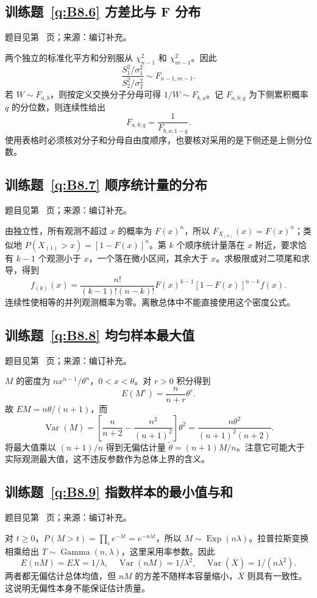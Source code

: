 \documentclass[UTF8,12pt,a4paper,fontset=fandol]{ctexbook}
\begin{document}
\subsection*{训练题~\ref{q:B8.6} 方差比与 F 分布}\label{a:B8.6}{\small 题目见第~\pageref{q:B8.6} 页；来源：编订补充。}
\begin{solve}两个独立的标准化平方和分别服从 $\chi^2_{n-1}$ 和 $\chi^2_{m-1}$。因此\[\frac{S_1^2/\sigma_1^2}{S_2^2/\sigma_2^2}\sim F_{n-1,m-1}.\]若 $W\sim F_{a,b}$，则按定义交换分子分母可得 $1/W\sim F_{b,a}$。记 $F_{a,b;q}$ 为下侧累积概率 $q$ 的分位数，则连续性给出\[F_{a,b;q}=\frac{1}{F_{b,a;1-q}}.\]使用表格时必须核对分子和分母自由度顺序，也要核对采用的是下侧还是上侧分位数。\end{solve}

\subsection*{训练题~\ref{q:B8.7} 顺序统计量的分布}\label{a:B8.7}{\small 题目见第~\pageref{q:B8.7} 页；来源：编订补充。}
\begin{solve}由独立性，所有观测不超过 $x$ 的概率为 $F(x)^n$，所以 $F_{X_{(n)}}(x)=F(x)^n$；类似地 $P(X_{(1)}>x)=[1-F(x)]^n$。第 $k$ 个顺序统计量落在 $x$ 附近，要求恰有 $k-1$ 个观测小于 $x$，一个落在微小区间，其余大于 $x$。求极限或对二项尾和求导，得到\[f_{(k)}(x)=\frac{n!}{(k-1)!(n-k)!}F(x)^{k-1}[1-F(x)]^{n-k}f(x).\]连续性使相等的并列观测概率为零。离散总体中不能直接使用这个密度公式。\end{solve}

\subsection*{训练题~\ref{q:B8.8} 均匀样本最大值}\label{a:B8.8}{\small 题目见第~\pageref{q:B8.8} 页；来源：编订补充。}
\begin{solve}$M$ 的密度为 $nx^{n-1}/\theta^n$，$0<x<\theta$。对 $r>0$ 积分得到\[E(M^r)=\frac{n}{n+r}\theta^r.\]故 $EM=n\theta/(n+1)$，而\[\operatorname{Var}(M)=\left[\frac{n}{n+2}-\frac{n^2}{(n+1)^2}\right]\theta^2=\frac{n\theta^2}{(n+1)^2(n+2)}.\]将最大值乘以 $(n+1)/n$ 得到无偏估计量 $\widetilde\theta=(n+1)M/n$。注意它可能大于实际观测最大值，这不违反参数作为总体上界的含义。\end{solve}

\subsection*{训练题~\ref{q:B8.9} 指数样本的最小值与和}\label{a:B8.9}{\small 题目见第~\pageref{q:B8.9} 页；来源：编订补充。}
\begin{solve}对 $t\ge0$，$P(M>t)=\prod_i e^{-\lambda t}=e^{-n\lambda t}$，所以 $M\sim\operatorname{Exp}(n\lambda)$。拉普拉斯变换相乘给出 $T\sim\operatorname{Gamma}(n,\lambda)$，这里采用率参数。因此\[E(nM)=E\overline X=1/\lambda,\quad\operatorname{Var}(nM)=1/\lambda^2,\quad\operatorname{Var}(\overline X)=1/(n\lambda^2).\]两者都无偏估计总体均值，但 $nM$ 的方差不随样本容量缩小，$\overline X$ 则具有一致性。这说明无偏性本身不能保证估计质量。\end{solve}
\end{document}
